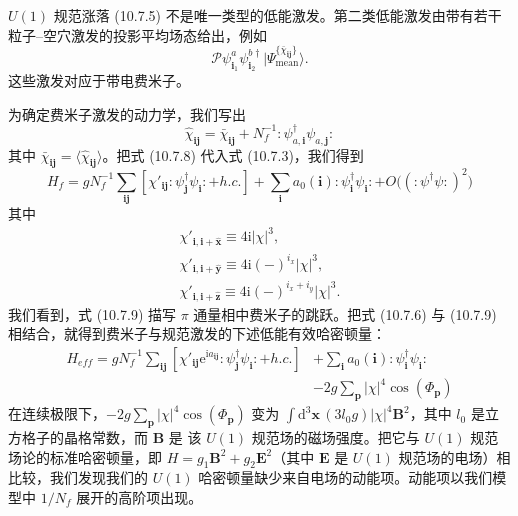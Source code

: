 $U(1)$ 规范涨落 (10.7.5) 不是唯一类型的低能激发。第二类低能激发由带有若干粒子--空穴激发的投影平均场态给出，例如
\begin{equation*}
\mathcal P\psi^{a}_{\pmb i_1}\psi^{b\dagger}_{\pmb i_2}|\Psi^{\{\bar\chi_{\pmb i\pmb j}\}}_{\mathrm{mean}}\rangle.\tag{10.7.7}
\end{equation*}
这些激发对应于带电费米子。

为确定费米子激发的动力学，我们写出
\begin{equation*}
\hat\chi_{\pmb i\pmb j}=\bar\chi_{\pmb i\pmb j}+N_f^{-1}:\psi^{\dagger}_{a,\pmb i}\psi_{a,\pmb j}:\tag{10.7.8}
\end{equation*}
其中 $\bar\chi_{\pmb i\pmb j}=\langle\hat\chi_{\pmb i\pmb j}\rangle$。把式 (10.7.8) 代入式 (10.7.3)，我们得到
\begin{equation*}
H_f=gN_f^{-1}\sum_{\pmb i\pmb j}[\chi'_{\pmb i\pmb j}:\psi^{\dagger}_{\pmb j}\psi_{\pmb i}:+h.c.]+\sum_{\pmb i}a_0(\pmb i):\psi^{\dagger}_{\pmb i}\psi_{\pmb i}:+O\big((:\psi^{\dagger}\psi:)^{2}\big)\tag{10.7.9}
\end{equation*}
其中
\begin{gather*}
\chi'_{\pmb i,\pmb i+\hat{\pmb x}}\equiv4\mathrm{i}|\chi|^{3},\\
\chi'_{\pmb i,\pmb i+\hat{\pmb y}}\equiv4\mathrm{i}(-)^{i_x}|\chi|^{3},\\
\chi'_{\pmb i,\pmb i+\hat{\pmb z}}\equiv4\mathrm{i}(-)^{i_x+i_y}|\chi|^{3}.\tag{10.7.10}
\end{gather*}
我们看到，式 (10.7.9) 描写 $\pi$ 通量相中费米子的跳跃。把式 (10.7.6) 与 (10.7.9) 相结合，就得到费米子与规范激发的下述低能有效哈密顿量：
\begin{align*}
H_{eff}=gN_f^{-1}\sum_{\pmb i\pmb j}[\chi'_{\pmb i\pmb j}\mathrm{e}^{\mathrm{i}a_{\pmb i\pmb j}}:\psi^{\dagger}_{\pmb j}\psi_{\pmb i}:+h.c.]&+\sum_{\pmb i}a_0(\pmb i):\psi^{\dagger}_{\pmb i}\psi_{\pmb i}:\\
&-2g\sum_{\pmb p}|\chi|^{4}\cos(\Phi_{\pmb p})\tag{10.7.11}
\end{align*}
在连续极限下，$-2g\sum_{\pmb p}|\chi|^{4}\cos(\Phi_{\pmb p})$ 变为 $\int\mathrm{d}^{3}\pmb x\,(3l_0 g)|\chi|^{4}\pmb B^{2}$，其中 $l_0$ 是立方格子的晶格常数，而 $\pmb B$ 是
该 $U(1)$ 规范场的磁场强度。把它与 $U(1)$ 规范场论的标准哈密顿量，即 $H=g_1\pmb B^{2}+g_2\pmb E^{2}$（其中 $\pmb E$ 是 $U(1)$ 规范场的电场）相比较，我们发现我们的 $U(1)$ 哈密顿量缺少来自电场的动能项。动能项以我们模型中 $1/N_f$ 展开的高阶项出现。

